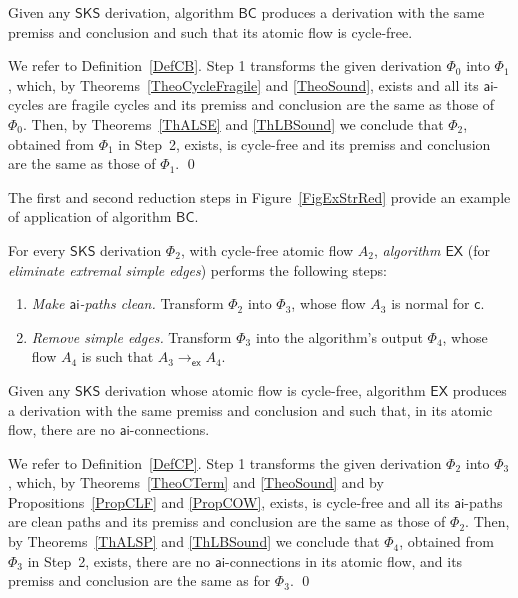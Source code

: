 \documentclass[a4paper]{LMCS}
\begin{document}
\begin{thm}\label{TheoElCycles}
Given any\/ ${\mathsf{SKS}}$ derivation, algorithm\/ ${{\mathsf{BC}}}$ produces a derivation with the same premiss and conclusion and such that its atomic flow is cycle-free.
\end{thm}

\proof
We refer to Definition~\ref{DefCB}. Step 1 transforms the given derivation $\Phi_0$ into $\Phi_1$, which, by Theorems~\ref{TheoCycleFragile} and \ref{TheoSound}, exists and all its ${\mathsf{ai}}$-cycles are fragile cycles and its premiss and conclusion are the same as those of $\Phi_0$. Then, by Theorems~\ref{ThALSE} and \ref{ThLBSound} we conclude that $\Phi_2$, obtained from $\Phi_1$ in Step~2, exists, is cycle-free and its premiss and conclusion are the same as those of $\Phi_1$.
\qed

The first and second reduction steps in Figure~\ref{FigExStrRed} provide an example of application of algorithm ${{\mathsf{BC}}}$.

\begin{defi}\label{DefCP}
For every ${\mathsf{SKS}}$ derivation $\Phi_2$, with cycle-free atomic flow $A_2$, \emph{algorithm\/ ${{\mathsf{EX}}}$} (for \emph {eliminate extremal simple edges}) performs the following steps: 
\begin{enumerate}
\item\emph{Make ${\mathsf{ai}}$-paths clean.} Transform $\Phi_2$ into $\Phi_3$, whose flow $A_3$ is normal for ${{\mathsf c}}$.
\item\emph{Remove simple edges.} Transform $\Phi_3$ into the algorithm's output $\Phi_4$, whose flow $A_4$ is such that $A_3\to_{{\mathsf{ex}}} A_4$.
\end{enumerate}
\end{defi}

\begin{thm}\label{TheoElPaths}
Given any\/ ${\mathsf{SKS}}$ derivation whose atomic flow is cycle-free, algorithm\/ ${{\mathsf{EX}}}$ produces a derivation with the same premiss and conclusion and such that, in its atomic flow, there are no\/ ${\mathsf{ai}}$-connections.
\end{thm}

\proof
We refer to Definition~\ref{DefCP}. Step 1 transforms the given derivation $\Phi_2$ into $\Phi_3$, which, by Theorems~\ref{TheoCTerm} and \ref{TheoSound} and by Propositions~\ref{PropCLF} and \ref{PropCOW}, exists, is cycle-free and all its ${\mathsf{ai}}$-paths are clean paths and its premiss and conclusion are the same as those of $\Phi_2$. Then, by Theorems~\ref{ThALSP} and \ref{ThLBSound} we conclude that $\Phi_4$, obtained from $\Phi_3$ in Step~2, exists, there are no ${\mathsf{ai}}$-connections in its atomic flow, and its premiss and conclusion are the same as for $\Phi_3$.
\qed
\end{document}
